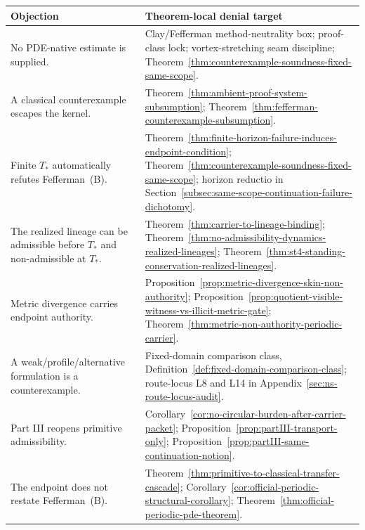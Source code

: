 \begin{tcolorbox}[breakable, title={Fast denial targets}, colback=gray!3!white, colframe=gray!65!black]
\small
\renewcommand{\arraystretch}{1.12}
\begin{tabularx}{0.98\textwidth}{@{}L{0.42\textwidth}Y@{}}
\toprule
\textbf{Objection} & \textbf{Theorem-local denial target}\\
\midrule
No PDE-native estimate is supplied. & Clay/Fefferman method-neutrality box; proof-class lock; vortex-stretching seam discipline; Theorem~\ref{thm:counterexample-soundness-fixed-same-scope}.\\
A classical counterexample escapes the kernel. & Theorem~\ref{thm:ambient-proof-system-subsumption}; Theorem~\ref{thm:fefferman-counterexample-subsumption}.\\
Finite $T_*$ automatically refutes Fefferman~(B). & Theorem~\ref{thm:finite-horizon-failure-induces-endpoint-condition}; Theorem~\ref{thm:counterexample-soundness-fixed-same-scope}; horizon reductio in Section~\ref{subsec:same-scope-continuation-failure-dichotomy}.\\
The realized lineage can be admissible before $T_*$ and non-admissible at $T_*$. & Theorem~\ref{thm:carrier-to-lineage-binding}; Theorem~\ref{thm:no-admissibility-dynamics-realized-lineages}; Theorem~\ref{thm:st4-standing-conservation-realized-lineages}.\\
Metric divergence carries endpoint authority. & Proposition~\ref{prop:metric-divergence-skin-non-authority}; Proposition~\ref{prop:quotient-visible-witness-vs-illicit-metric-gate}; Theorem~\ref{thm:metric-non-authority-periodic-carrier}.\\
A weak/profile/alternative formulation is a counterexample. & Fixed-domain comparison class, Definition~\ref{def:fixed-domain-comparison-class}; route-locus L8 and L14 in Appendix~\ref{sec:ns-route-locus-audit}.\\
Part III reopens primitive admissibility. & Corollary~\ref{cor:no-circular-burden-after-carrier-packet}; Proposition~\ref{prop:partIII-transport-only}; Proposition~\ref{prop:partIII-same-continuation-notion}.\\
The endpoint does not restate Fefferman~(B). & Theorem~\ref{thm:primitive-to-classical-transfer-cascade}; Corollary~\ref{cor:official-periodic-structural-corollary}; Theorem~\ref{thm:official-periodic-pde-theorem}.\\
\bottomrule
\end{tabularx}
\end{tcolorbox}


